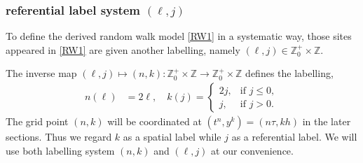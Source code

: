 \documentclass[a4paper,11pt]{article}
\def\red{\color{red}}
\def\blue{\color{blue}}
\def\l{{h}}
\theoremstyle{remark}
\newtheorem{remark}{Remark}[section]
\begin{document}
\subsubsection{referential label system $(\ell,j)$}
To define the derived random walk model \eqref{RW1} in a systematic way, those sites appeared in \eqref{RW1} are given another labelling, namely $(\ell,j)\in \mathbb{Z}_0^+ \times \mathbb{Z}$.

The inverse map $(\ell,j)\mapsto (n,k): \mathbb{Z}_0^+ \times \mathbb{Z} \rightarrow \mathbb{Z}_0^+ \times \mathbb{Z}$ defines the labelling,
\begin{align*}
 n(\ell) &= 2\ell, \quad 
 k(j)  =\left\{\begin{array}{lr}
        2j, & \text{if } j\le0,\\
        j, & \text{if }  j>0.
        \end{array}\right.
\end{align*}
The grid point $(n,k)$ will be coordinated at $(t^n,y^k)=(n\tau,k\l)$ in the later sections. Thus we regard $k$ as a spatial label while $j$ as a referential label. We will use both  labelling system $(n,k)$ and $(\ell,j)$ at our convenience. 

\end{document}
